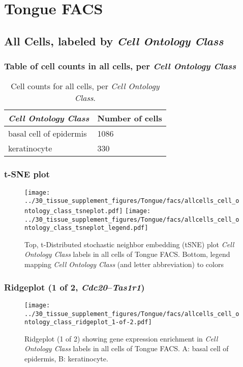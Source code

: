 \clearpage
\section{Tongue FACS}

\subsection{All Cells, labeled by \emph{Cell Ontology Class}}
\subsubsection{Table of cell counts in all cells, per \emph{Cell Ontology Class}}\begin{table}[h]
\centering
\label{my-label}
\begin{tabular}{@{}ll@{}}
\toprule

\emph{Cell Ontology Class}& Number of cells \\ \midrule
basal cell of epidermis & 1086 \\

keratinocyte & 330 \\
\bottomrule
\end{tabular}
\caption{Cell counts for all cells, per \emph{Cell Ontology Class}.}
\end{table}

\clearpage
\subsubsection{t-SNE plot}
\begin{figure}[h]
\centering
\texttt{[image: ../30\_tissue\_supplement\_figures/Tongue/facs/allcells\_cell\_ontology\_class\_tsneplot.pdf]}
\texttt{[image: ../30\_tissue\_supplement\_figures/Tongue/facs/allcells\_cell\_ontology\_class\_tsneplot\_legend.pdf]}
\caption{Top, t-Distributed stochastic neighbor embedding (tSNE) plot  \emph{Cell Ontology Class} labels in all cells of Tongue FACS. Bottom, legend mapping \emph{Cell Ontology Class} (and letter abbreviation) to colors}
\end{figure}


\clearpage

\subsubsection{Ridgeplot (1 of 2, \emph{Cdc20}--\emph{Tas1r1})}
\begin{figure}[h]
\centering
\texttt{[image: ../30\_tissue\_supplement\_figures/Tongue/facs/allcells\_cell\_ontology\_class\_ridgeplot\_1-of-2.pdf]}

\caption{ Ridgeplot (1 of 2)  showing gene expression enrichment in \emph{Cell Ontology Class} labels in all cells of Tongue FACS. A: basal cell of epidermis, B: keratinocyte.}
\end{figure}


